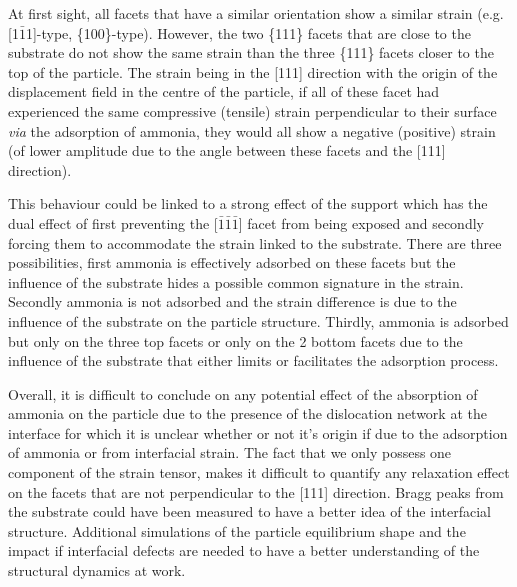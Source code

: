 At first sight, all facets that have a similar orientation show a similar strain (e.g. [1$\bar{1}$1]-type, \{100\}-type).
However, the two \{111\} facets that are close to the substrate do not show the same strain than the three \{111\} facets closer to the top of the particle.
The strain being in the [111] direction with the origin of the displacement field in the centre of the particle, if all of these facet had experienced the same compressive (tensile) strain perpendicular to their surface \textit{via} the adsorption of ammonia, they would all show a negative (positive) strain (of lower amplitude due to the angle between these facets and the [111] direction).

This behaviour could be linked to a strong effect of the support which has the dual effect of first preventing the [$\bar{1}\bar{1}\bar{1}$] facet from being exposed and secondly forcing them to accommodate the strain linked to the substrate.
There are three possibilities, first ammonia is effectively adsorbed on these facets but the influence of the substrate hides a possible common signature in the strain.
Secondly ammonia is not adsorbed and the strain difference is due to the influence of the substrate on the particle structure.
Thirdly, ammonia is adsorbed but only on the three top facets or only on the 2 bottom facets due to the influence of the substrate that either limits or facilitates the adsorption process.



Overall, it is difficult to conclude on any potential effect of the absorption of ammonia on the particle due to the presence of the dislocation network at the interface for which it is unclear whether or not it's origin if due to the adsorption of ammonia or from interfacial strain.
The fact that we only possess one component of the strain tensor, makes it difficult to quantify any relaxation effect on the facets that are not perpendicular to the [111] direction.
Bragg peaks from the substrate could have been measured to have a better idea of the interfacial structure.
Additional simulations of the particle equilibrium shape and the impact if interfacial defects are needed to have a better understanding of the structural dynamics at work.

